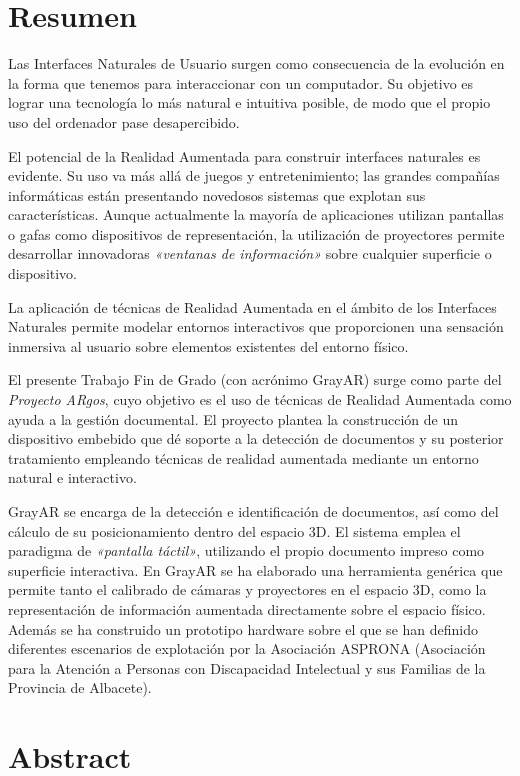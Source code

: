 \chapter{Resumen}
Las Interfaces Naturales de Usuario surgen como consecuencia de la evolución en la forma que tenemos para interaccionar con un computador. Su objetivo es lograr una tecnología lo más natural e intuitiva posible, de modo que el propio uso del ordenador pase desapercibido. 

El potencial de la Realidad Aumentada para construir interfaces naturales es evidente. Su uso va más allá de juegos y entretenimiento; las grandes compañías informáticas están presentando novedosos sistemas que explotan sus características. Aunque actualmente la mayoría de aplicaciones utilizan pantallas o gafas como dispositivos de representación, la utilización de proyectores permite desarrollar innovadoras \textit{«ventanas de información»} sobre cualquier superficie o dispositivo. 

La aplicación de técnicas de Realidad Aumentada en el ámbito de los Interfaces Naturales permite modelar entornos interactivos que proporcionen una sensación inmersiva al usuario sobre elementos existentes del entorno físico. 

El presente Trabajo Fin de Grado (con acrónimo GrayAR) surge como parte del \textit{Proyecto ARgos}, cuyo objetivo es el uso de técnicas de Realidad Aumentada como ayuda a la gestión documental. El proyecto plantea la construcción de un dispositivo embebido que dé soporte a la detección de documentos y su posterior tratamiento empleando técnicas de realidad aumentada mediante un entorno natural e interactivo.

GrayAR se encarga de la detección e identificación de documentos, así como del cálculo de su posicionamiento dentro del espacio 3D. El sistema emplea el paradigma de \textit{«pantalla táctil»}, utilizando el propio documento impreso como superficie interactiva. En GrayAR se ha elaborado una herramienta genérica que permite tanto el calibrado de cámaras y proyectores en el espacio 3D, como la representación de información aumentada directamente sobre el espacio físico. Además se ha construido un prototipo hardware sobre el que se han definido diferentes escenarios de explotación por la Asociación ASPRONA (Asociación para la Atención a Personas con Discapacidad Intelectual y sus Familias de la Provincia de Albacete).

\chapter{Abstract}

